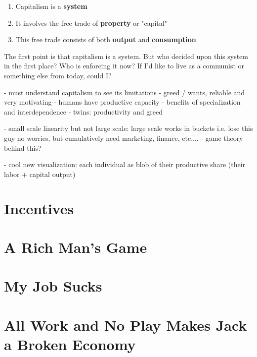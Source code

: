 \documentclass[12pt]{memoir}
\begin{document}
				\begin{enumerate}
					\item Capitalism is a \textbf{system}
					\item It involves the free trade of \textbf{property} or "capital"
					\item This free trade consists of both \textbf{output} and \textbf{consumption}
				\end{enumerate}
			
			The first point is that capitalism is a system. But who decided upon this system in the first place? Who is enforcing it now? If I'd like to live as a communist or something 
			else from today, could I? 
			
			
			- must understand capitalism to see its limitations
			- greed / wants, reliable and very motivating
			- humans have productive capacity
			- benefits of specialization and interdependence
			- twins: productivity and greed
			
			- small scale linearity but not large scale: large scale works in buckets i.e. lose this guy no worries, but cumulatively need marketing, finance, etc....
			- game theory behind this?
			
			- cool new visualization: each individual as blob of their productive share (their labor + capital output)
		
		\section{Incentives}
		
		 \section{A Rich Man's Game}
		 
		\section{My Job Sucks}
		
		\section{All Work and No Play Makes Jack a Broken Economy}
		
\end{document}
